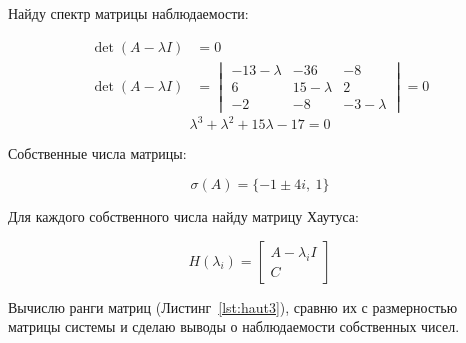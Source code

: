 \documentclass[a4paper,12pt]{article}
\begin{document}
	Найду спектр матрицы наблюдаемости:
	
	\[
	\begin{aligned}
		\operatorname{det}(A - \lambda I) &= 0 \\
		\det(A-\lambda I) &=
		\begin{vmatrix}
			-13-\lambda & -36 & -8 \\
			6 & 15-\lambda & 2 \\
			-2 & -8 & -3-\lambda
		\end{vmatrix} =0
	\end{aligned}
	\]
	\[
	\lambda^3 + \lambda^2 + 15\lambda - 17 = 0
	\]
	
	Собственные числа матрицы:
	
	\[
	\sigma(A) = \{-1 \pm 4i, \ 1\}
	\]
	
	Для каждого собственного числа найду матрицу Хаутуса:
	
	\[H(\lambda_i) = \begin{bmatrix} A - \lambda_i I \\ C \end{bmatrix}	\]
	
Вычислю ранги матриц (Листинг~\ref{lst:haut3}), сравню их с размерностью матрицы системы и сделаю выводы о наблюдаемости собственных чисел.
\end{document}
